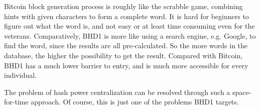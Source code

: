 \begin{flushleft}
    Bitcoin block generation process is roughly like the scrabble game, combining hints with given characters to form a complete word. It is hard for beginners to figure out what the word is, and not easy or at least time consuming even for the veterans. Comparatively, BHD1 is more like using a search engine, e.g. Google, to find the word, since the results are all pre-calculated. So the more words in the database, the higher the possibility to get the result. Compared with Bitcoin, BHD1 has a much lower barrier to entry, and is much more accessible for every individual.
\end{flushleft}
\begin{flushleft}
    The problem of hash power centralization can be resolved through such a space-for-time approach. Of course, this is just one of the problems BHD1 targets.
\end{flushleft}
